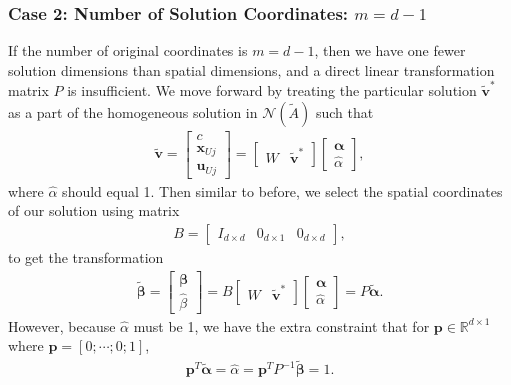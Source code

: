 \documentclass[%
preprint,
 amsmath,amssymb,
 aps,
]{revtex4-1}
\newcommand{\mc}{\mathcal}
\newcommand{\real}{\mathbb{R}}
\begin{document}
\subsubsection{Case 2: Number of Solution Coordinates: $m = d-1$}
If the number of original coordinates is $m = d-1$, then we have one fewer solution dimensions than spatial dimensions, and a direct linear transformation matrix $P$ is insufficient. We move forward by treating the particular solution $\bm{\tilde{v}}^*$ as a part of the homogeneous solution in $\mc N(\tilde{A})$ such that
\begin{align*}
\bm{\tilde{v}} 
=
\begin{bmatrix}
c\\
\bm{x}_{Uj}\\
\bm{u}_{Uj}
\end{bmatrix}
= 
\begin{bmatrix}
W & \bm{\tilde{v}}^*
\end{bmatrix}
\begin{bmatrix}
\bm{\alpha}\\
\hat{\alpha}
\end{bmatrix},
\end{align*}
where $\hat{\alpha}$ should equal 1. Then similar to before, we select the spatial coordinates of our solution using matrix
\begin{align*}
B = 
\begin{bmatrix}
I_{d \times d} & 0_{d \times 1} & 0_{d \times d}
\end{bmatrix},
\end{align*}
to get the transformation
\begin{align*}
\bm{\tilde{\beta}} = 
\begin{bmatrix}
\bm{\beta}\\
\hat{\beta}
\end{bmatrix}
= 
B\begin{bmatrix}
W & \bm{\tilde{v}}^*
\end{bmatrix}
\begin{bmatrix}
\bm{\alpha}\\
\hat{\alpha}
\end{bmatrix}
=
P \bm{\tilde{\alpha}}.
\end{align*}
However, because $\hat{\alpha}$ must be 1, we have the extra constraint that for $\bm{p} \in \real^{d \times 1}$ where $\bm{p} = [0; \dotsm; 0; 1]$,
\begin{align*}
\bm{p}^T \bm{\tilde{\alpha}} = \hat{\alpha} = \bm{p}^T P^{-1}\bm{\tilde{\beta}} = 1.
\end{align*}
\end{document}
